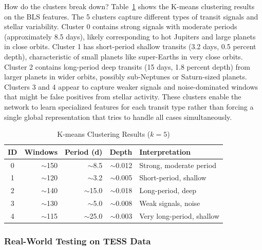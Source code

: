 \documentclass[letterpaper]{article} %
\begin{document}
How do the clusters break down? Table~\ref{tab:bilstm_clusters} shows the K-means clustering results on the BLS features. The 5 clusters capture different types of transit signals and stellar variability. Cluster 0 contains strong signals with moderate periods (approximately 8.5 days), likely corresponding to hot Jupiters and large planets in close orbits. Cluster 1 has short-period shallow transits (3.2 days, 0.5 percent depth), characteristic of small planets like super-Earths in very close orbits. Cluster 2 contains long-period deep transits (15 days, 1.8 percent depth) from larger planets in wider orbits, possibly sub-Neptunes or Saturn-sized planets. Clusters 3 and 4 appear to capture weaker signals and noise-dominated windows that might be false positives from stellar activity. These clusters enable the network to learn specialized features for each transit type rather than forcing a single global representation that tries to handle all cases simultaneously.

\begin{table}[h]
\centering
\caption{K-means Clustering Results ($k=5$)}
\label{tab:bilstm_clusters}
\begin{tabular}{@{}crrrp{3.2cm}@{}}
\toprule
\textbf{ID} & \textbf{Windows} & \textbf{Period (d)} & \textbf{Depth} & \textbf{Interpretation} \\
\midrule
0 & $\sim$150 & $\sim$8.5 & $\sim$0.012 & Strong, moderate period \\
1 & $\sim$120 & $\sim$3.2 & $\sim$0.005 & Short-period, shallow \\
2 & $\sim$140 & $\sim$15.0 & $\sim$0.018 & Long-period, deep \\
3 & $\sim$130 & $\sim$5.0 & $\sim$0.008 & Weak signals, noise \\
4 & $\sim$115 & $\sim$25.0 & $\sim$0.003 & Very long-period, shallow \\
\bottomrule
\end{tabular}
\end{table}

\subsubsection{Real-World Testing on TESS Data}
\end{document}
